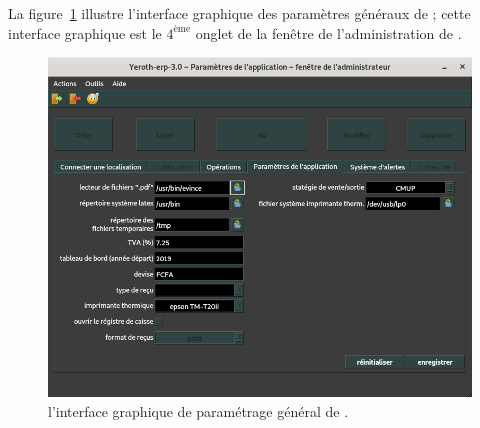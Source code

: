 

La figure~\ref{fig:yeren-parametres} illustre l'interface
graphique des param\`etres g\'en\'eraux de \yeroth;
cette interface graphique est le $4^{\text{\`eme}}$
onglet de la fen\^etre de l'administration de \yeroth.

\begin{figure}[!htpb]
	\centering
	\includegraphics[scale=0.45]{images/yeroth-administration-parametres-generaux.png}
	\caption{l'interface graphique de param\'etrage g\'en\'eral
		de \yeroth.}\label{fig:yeren-parametres}
\end{figure}


